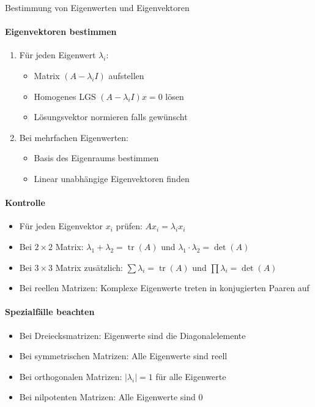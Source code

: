 \begin{KR}{Bestimmung von Eigenwerten und Eigenvektoren}
\paragraph{Eigenvektoren bestimmen}
\begin{enumerate}
    \item Für jeden Eigenwert $\lambda_i$:
    \begin{itemize}
        \item Matrix $(A - \lambda_i I)$ aufstellen
        \item Homogenes LGS $(A - \lambda_i I)x = 0$ lösen
        \item Lösungsvektor normieren falls gewünscht
    \end{itemize}

    \item Bei mehrfachen Eigenwerten:
    \begin{itemize}
        \item Basis des Eigenraums bestimmen
        \item Linear unabhängige Eigenvektoren finden
    \end{itemize}
\end{enumerate}

\paragraph{Kontrolle}
\begin{itemize}
    \item Für jeden Eigenvektor $x_i$ prüfen: $Ax_i = \lambda_i x_i$
    \item Bei $2 \times 2$ Matrix: $\lambda_1 + \lambda_2 = \operatorname{tr}(A)$ und $\lambda_1 \cdot \lambda_2 = \det(A)$
    \item Bei $3 \times 3$ Matrix zusätzlich: $\sum \lambda_i = \operatorname{tr}(A)$ und $\prod \lambda_i = \det(A)$
    \item Bei reellen Matrizen: Komplexe Eigenwerte treten in konjugierten Paaren auf
\end{itemize}

\paragraph{Spezialfälle beachten}
\begin{itemize}
    \item Bei Dreiecksmatrizen: Eigenwerte sind die Diagonalelemente
    \item Bei symmetrischen Matrizen: Alle Eigenwerte sind reell
    \item Bei orthogonalen Matrizen: $|\lambda_i| = 1$ für alle Eigenwerte
    \item Bei nilpotenten Matrizen: Alle Eigenwerte sind 0
\end{itemize}
\end{KR}

